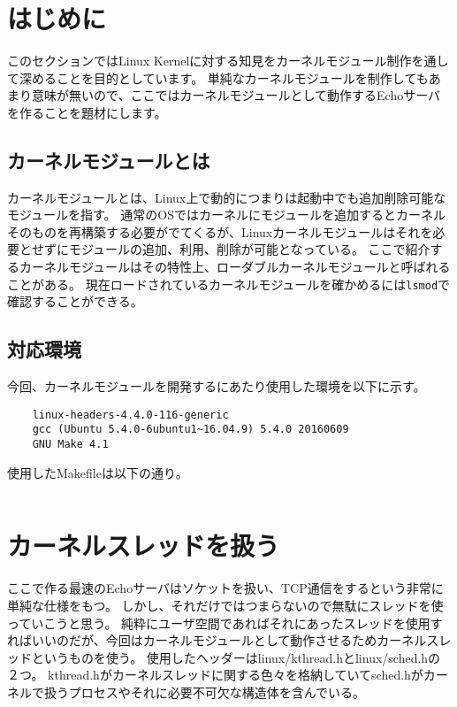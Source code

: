 \section{はじめに}
このセクションではLinux Kernelに対する知見をカーネルモジュール制作を通して深めることを目的としています。
単純なカーネルモジュールを制作してもあまり意味が無いので、ここではカーネルモジュールとして動作するEchoサーバを作ることを題材にします。

\subsection{カーネルモジュールとは}
カーネルモジュールとは、Linux上で動的につまりは起動中でも追加削除可能なモジュールを指す。
通常のOSではカーネルにモジュールを追加するとカーネルそのものを再構築する必要がでてくるが、Linuxカーネルモジュールはそれを必要とせずにモジュールの追加、利用、削除が可能となっている。
ここで紹介するカーネルモジュールはその特性上、ローダブルカーネルモジュールと呼ばれることがある。
現在ロードされているカーネルモジュールを確かめるには\texttt{lsmod}で確認することができる。

\subsection{対応環境}
今回、カーネルモジュールを開発するにあたり使用した環境を以下に示す。
\begin{verbatim}
    linux-headers-4.4.0-116-generic
    gcc (Ubuntu 5.4.0-6ubuntu1~16.04.9) 5.4.0 20160609
    GNU Make 4.1
\end{verbatim}

使用したMakefileは以下の通り。
\inputminted[frame=lines,framesep=2mm,baselinestretch=1.2,fontsize=\footnotesize,linenos,breaklines]{bash}{\lrfasset/Makefile}

\section{カーネルスレッドを扱う}
ここで作る最速のEchoサーバはソケットを扱い、TCP通信をするという非常に単純な仕様をもつ。
しかし、それだけではつまらないので無駄にスレッドを使っていこうと思う。
純粋にユーザ空間であればそれにあったスレッドを使用すればいいのだが、今回はカーネルモジュールとして動作させるためカーネルスレッドというものを使う。
使用したヘッダーはlinux/kthread.hとlinux/sched.hの２つ。
kthread.hがカーネルスレッドに関する色々を格納していてsched.hがカーネルで扱うプロセスやそれに必要不可欠な構造体を含んでいる。

